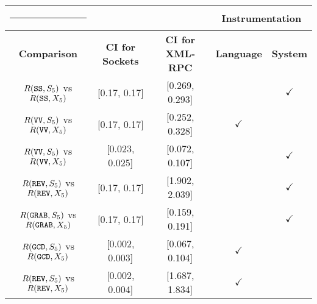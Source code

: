\documentclass{sig-alternate}
\begin{document}
\begin{table*}[t]

\begin{center}
\begin{tabular}{cccc|c|}

\cline{4-5}

\begin{minipage}{1in}\rule{-.1in}{14pt}\end{minipage}  &                      &                      & \multicolumn{2}{|c|}{{\bf Instrumentation}} \\
\hline
\multicolumn{1}{|c||}{{\bf Comparison}} & \multicolumn{1}{|c|}{{\bf CI for Sockets}} & \multicolumn{1}{|c|}{{\bf CI for XML-RPC}} & {\bf Language} & {\bf System} \\
\hline

 \multicolumn{1}{|c||}{$R(\mbox{\texttt{SS}},S_{5})$ vs $ R(\mbox{\texttt{SS}},X_{5})$}  & \multicolumn{1}{|c|}{[0.17, 0.17]} & \multicolumn{1}{|c|}{[0.269, 0.293]} & & $\checkmark$ \\

\hline
\multicolumn{1}{|c||}{$R(\mbox{\texttt{VV}},S_{5})$ vs $R(\mbox{\texttt{VV}},X_{5})$}  & \multicolumn{1}{|c|}{[0.17, 0.17]} & \multicolumn{1}{|c|}{[0.252, 0.328]} & $\checkmark$ & \\

\hline
\multicolumn{1}{|c||}{$R(\mbox{\texttt{VV}},S_{5})$ vs $R(\mbox{\texttt{VV}},X_{5})$} & \multicolumn{1}{|c|}{[0.023, 0.025]} & \multicolumn{1}{|c|}{[0.072, 0.107]} & & $\checkmark$ \\

\hline
\multicolumn{1}{|c||}{$R(\mbox{\texttt{REV}},S_{5})$ vs $R(\mbox{\texttt{REV}},X_{5})$} & \multicolumn{1}{|c|}{[0.17, 0.17]} & \multicolumn{1}{|c|}{[1.902, 2.039]} & & $\checkmark$ \\

\hline
\multicolumn{1}{|c||}{$R(\mbox{\texttt{GRAB}},S_{5})$ vs $R(\mbox{\texttt{GRAB}},X_{5})$} & \multicolumn{1}{|c|}{[0.17, 0.17]} & \multicolumn{1}{|c|}{[0.159, 0.191]} & & $\checkmark$ \\

\hline
\multicolumn{1}{|c||}{$R(\mbox{\texttt{GCD}},S_{5})$ vs $R(\mbox{\texttt{GCD}},X_{5})$} & \multicolumn{1}{|c|}{[0.002, 0.003]} & \multicolumn{1}{|c|}{[0.067, 0.104]} & $\checkmark$ & \\

\hline
\multicolumn{1}{|c||}{$R(\mbox{\texttt{REV}},S_{5})$ vs $R(\mbox{\texttt{REV}},X_{5})$} & \multicolumn{1}{|c|}{[0.002, 0.004]} & \multicolumn{1}{|c|}{[1.687, 1.834]} & $\checkmark$ & \\


\end{tabular}
\end{center}
\end{table*}
\end{document}
